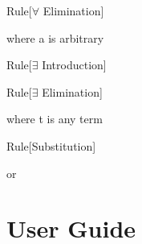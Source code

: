 \begin{namedthm}{Rule}[$\forall$ Elimination]

\begin{bprooftree}
\end{bprooftree}\qquad where a is arbitrary \qquad

\end{namedthm}


\begin{namedthm}{Rule}[$\exists$ Introduction]

\begin{bprooftree}
\end{bprooftree}\qquad

\end{namedthm}

\begin{namedthm}{Rule}[$\exists$ Elimination]

\begin{bprooftree}
\end{bprooftree}\qquad where t is any term

\end{namedthm}

\begin{namedthm}{Rule}[Substitution]

\begin{bprooftree}
\end{bprooftree}\qquad or \qquad
\begin{bprooftree}
\end{bprooftree}

\end{namedthm}

\pagebreak

 



\section{User Guide  \label{appendix:userGuide}}

